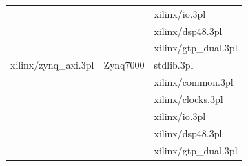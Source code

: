 \begin{tabular}{| l | l | l |}
                     &                                 & xilinx/io.3pl \\
                     &                                 & xilinx/dsp48.3pl \\
                     &                                 & xilinx/gtp\_dual.3pl \\ \hline
    xilinx/zynq\_axi.3pl & Zynq7000                    & stdlib.3pl \\
                     &                                 & xilinx/common.3pl \\
                     &                                 & xilinx/clocks.3pl \\
                     &                                 & xilinx/io.3pl \\
                     &                                 & xilinx/dsp48.3pl \\
                     &                                 & xilinx/gtp\_dual.3pl \\ \hline
    
    \end{tabular}
    


